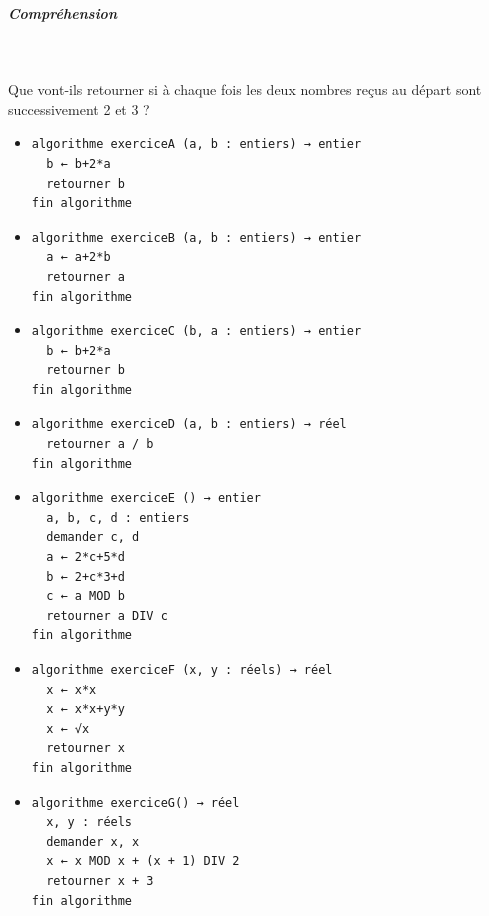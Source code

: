 \documentclass[11pt,a4paper]{article}
\begin{document}
			
		\subparagraph{Compr\'ehension} 
		
                \textcolor{white}{.} \par
            
							  Que vont-ils retourner si \`a chaque fois les deux nombres re\c cus au d\'epart sont successivement 2 et 3 ?
							
					\begin{itemize}
				
			\item \begin{verbatim}
algorithme exerciceA (a, b : entiers) → entier
  b ← b+2*a
  retourner b
fin algorithme
				\end{verbatim} \textcolor{gray}{\underline{\hspace*{1em}}} 
			\item \begin{verbatim}
algorithme exerciceB (a, b : entiers) → entier
  a ← a+2*b
  retourner a
fin algorithme
				\end{verbatim} \textcolor{gray}{\underline{\hspace*{1em}}} 
			\item \begin{verbatim}
algorithme exerciceC (b, a : entiers) → entier
  b ← b+2*a
  retourner b
fin algorithme
				\end{verbatim} \textcolor{gray}{\underline{\hspace*{1em}}} 
			\item \begin{verbatim}
algorithme exerciceD (a, b : entiers) → réel
  retourner a / b
fin algorithme
				\end{verbatim} \textcolor{gray}{\underline{\hspace*{1em}}} 
			\item \begin{verbatim}
algorithme exerciceE () → entier
  a, b, c, d : entiers
  demander c, d
  a ← 2*c+5*d
  b ← 2+c*3+d
  c ← a MOD b
  retourner a DIV c
fin algorithme
				\end{verbatim} \textcolor{gray}{\underline{\hspace*{1em}}} 
			\item \begin{verbatim}
algorithme exerciceF (x, y : réels) → réel
  x ← x*x 
  x ← x*x+y*y 
  x ← √x
  retourner x
fin algorithme
				\end{verbatim} \textcolor{gray}{\underline{\hspace*{2em}}} 
			\item \begin{verbatim}
algorithme exerciceG() → réel
  x, y : réels
  demander x, x
  x ← x MOD x + (x + 1) DIV 2
  retourner x + 3
fin algorithme
				\end{verbatim} \textcolor{gray}{\underline{\hspace*{1em}}} 
					\end{itemize}
				
\end{document}
